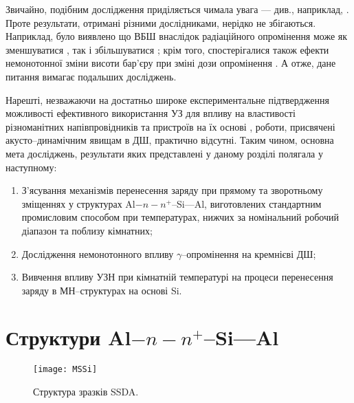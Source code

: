 
Звичайно, подібним дослідження приділяється чимала увага  --- див., наприклад,
\cite{Kumar1, Rao, Kumar2, Sharma, Ohyama, Tataroglu,Tascioglu2010old,Tataroglu:2007NIMA,Tataroglu3,Karatas:2006NIMA,Umana,Kinoshita,Vorobets,Pattabi,Kovalyuk,Verma}.
Проте результати, отримані різними дослідниками, нерідко не збігаються.
Наприклад, було виявлено що ВБШ внаслідок радіаційного опромінення може як зменшуватися \cite{Kumar1, Rao, Kumar2, Sharma, Ohyama,Tataroglu3},
так і збільшуватися \cite{Tataroglu,Tascioglu2010old,Tataroglu:2007NIMA};
крім того, спостерігалися також ефекти немонотонної зміни висоти бар'єру при зміні дози опромінення \cite{Karatas:2006NIMA,Umana,Kinoshita,Vorobets, Pattabi, Kovalyuk,Verma}.
А отже, дане питання вимагає подальших досліджень.

Нарешті, незважаючи на достатньо широке експериментальне підтвердження можливості ефективного використання УЗ для впливу на властивості різноманітних напівпровідників та
пристроїв на їх основі
\cite{Bahar2003,ZobovFTP2008,Parchinskii2006r,Roman:2007APL,Roman:2010JAP,Zaver2005,Davletova2008,Teterkin2009r,Tagaev,Pashaev2012r,YOlikhTPL2011r,Zaveryukhin2002:2},
роботи, присвячені акусто--динамічним явищам в ДШ, практично відсутні.
Таким чином, основна мета досліджень, результати яких представлені у даному розділі полягала у наступному:
\begin{enumerate}
  \item З'ясування механізмів перенесення заряду  при прямому та
    зворотньому зміщеннях у структурах Al$-n-n^+$--Si---Al, виготовлених стандартним промисловим способом при температурах, нижчих за номінальний робочий діапазон та поблизу кімнатних;
  \item Дослідження немонотонного впливу $\gamma$--опромінення на кремнієві ДШ;
  \item Вивчення впливу УЗН при кімнатній температурі на процеси перенесення заряду в МН--структурах на основі Si.
\end{enumerate}



\section{Структури Al$-n-n^+$--Si---Al\label{MSSi}}

\begin{figure}[b]
\center
\texttt{[image: MSSi]}%
\caption{\label{figMSSi}
Структура зразків SSDA.
}
\end{figure}

